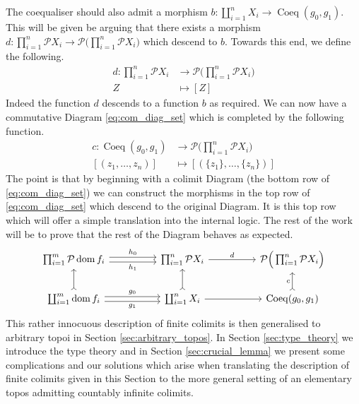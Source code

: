 \documentclass{tac}
\newcommand{\call}[1]{\mathcal{#1}}
\newcommand{\lto}{\longrightarrow}
\begin{document}
	The coequaliser should also admit a morphism $b: \coprod_{i = 1}^n X_i \lto \operatorname{Coeq}(g_0,g_1)$. This will be given be arguing that there exists a morphism $d: \prod_{i = 1}^n \call{P}X_i \lto \call{P}\Big(\prod_{i =1 }^n \call{P}X_i\Big)$ which descend to $b$. Towards this end, we define the following.
	\begin{align*}
		d: \prod_{i = 1}^n\call{P}X_i &\lto \call{P}\Big(\prod_{i = 1}^n \call{P}X_i\Big)\\
		Z &\longmapsto [Z]
	\end{align*}
	Indeed the function $d$ descends to a function $b$ as required. We can now have a commutative Diagram \eqref{eq:com_diag_set} which is completed by the following function.
	\begin{align*}
		c: \operatorname{Coeq}(g_0,g_1) &\lto \call{P}\Big(\prod_{i = 1}^n \call{P}X_i\Big)\\
		[(z_1,\hdots,z_n)] &\longmapsto [(\lbrace z_1 \rbrace, \hdots, \lbrace z_n \rbrace)]
	\end{align*}
	The point is that by beginning with a colimit Diagram (the bottom row of \eqref{eq:com_diag_set}) we can construct the morphisms in the top row of \eqref{eq:com_diag_set} which descend to the original Diagram. It is this top row which will offer a simple translation into the internal logic. The rest of the work will be to prove that the rest of the Diagram behaves as expected.
	\begin{equation}\label{eq:com_diag_set}
		\begin{tikzcd}[column sep = huge]
			\prod_{i = 1}^m \call{P}\operatorname{dom}f_i\arrow[r,shift left, "{h_0}"]\arrow[r,shift right,swap, "{h_1}"] & \prod_{i = 1}^n \call{P}X_i\arrow[r,"{d}"] & \call{P}\Big(\prod_{i = 1}^n \call{P}X_i\Big)\\
			\coprod_{i = 1}^m \operatorname{dom}f_i\arrow[u,rightarrowtail]\arrow[r,shift left, "{g_0}"]\arrow[r,shift right, swap, "{g_1}"] & \coprod_{i = 1}^n X_i\arrow[u,rightarrowtail]\arrow[r] & \operatorname{Coeq}(g_0,g_1)\arrow[u,rightarrowtail, "{c}"]
		\end{tikzcd}
	\end{equation}
	This rather innocuous description of finite colimits is then generalised to arbitrary topoi in Section \ref{sec:arbitrary_topos}. In Section \ref{sec:type_theory} we introduce the type theory and in Section \ref{sec:crucial_lemma} we present some complications and our solutions which arise when translating the description of finite colimits given in this Section to the more general setting of an elementary topos admitting countably infinite colimits.
	
\end{document}

